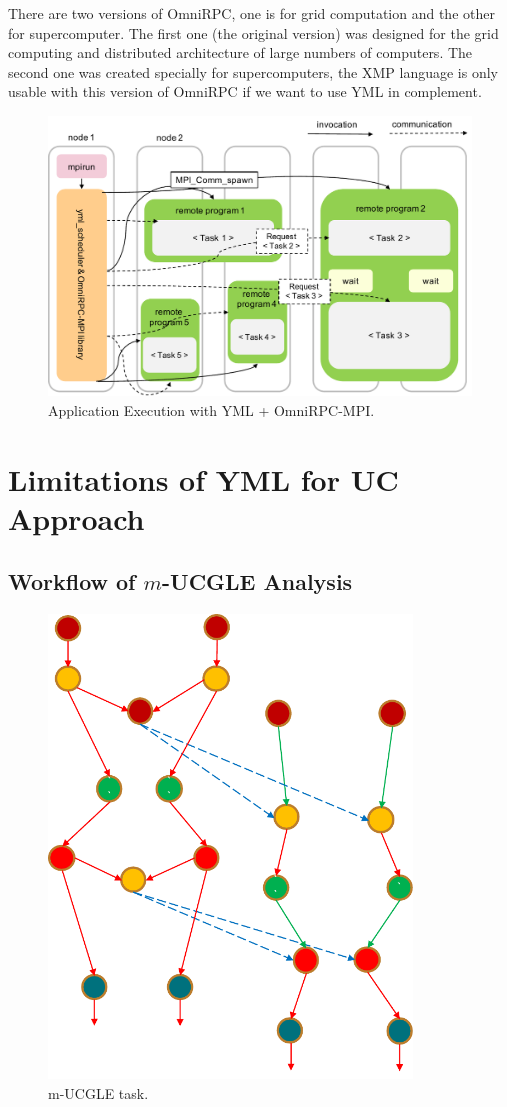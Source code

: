 There are two versions of OmniRPC, one is for grid computation and the other for supercomputer. The first one (the original version) was designed for the grid computing and distributed architecture of large numbers of computers. The second one was created specially for supercomputers, the XMP language is only usable with this version of OmniRPC if we want to use YML in complement.


\begin{figure}[htbp]
	\centering
	\includegraphics[width=.92\linewidth]{fig/xmp-yml-exec.pdf}
	\caption{Application Execution with YML + OmniRPC-MPI.}
	\label{xmp-yml-exec}
\end{figure}


\section{Limitations of YML for UC Approach}

\subsection{Workflow of $m$-UCGLE Analysis}


\begin{figure}[htbp]
	\centering
	\includegraphics[width=3.8in]{fig/m-UCGLE-task.pdf}
	\caption{m-UCGLE task.}
	\label{m-UCGLE-task}
\end{figure}


